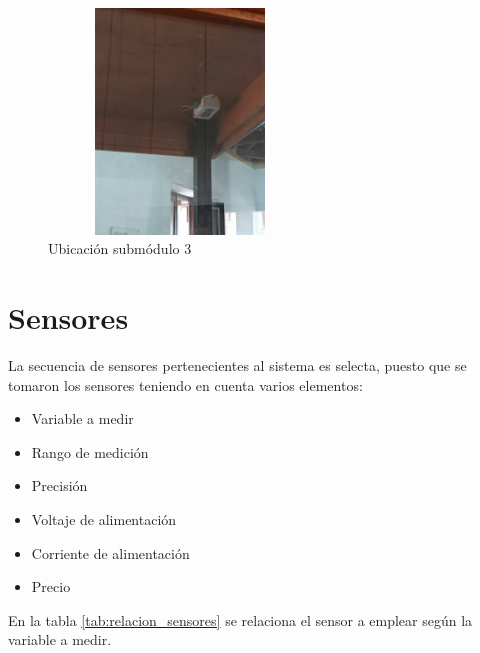     \begin{figure}[H]
        \centering
        \includegraphics[width=7cm, height=6cm]{imagenes/submodulo 3.jpg}
        \caption{Ubicación submódulo 3}
        \label{imag:ubicacion_submodulo3}
      \end{figure}

\section{Sensores} \label{sec:sensores}

    La secuencia de sensores pertenecientes al sistema es selecta, puesto que se tomaron los sensores teniendo en cuenta varios elementos:

    \begin{itemize}
        \item Variable a medir
        \item Rango de medición
        \item Precisión
        \item Voltaje de alimentación
        \item Corriente de alimentación
        \item Precio
    \end{itemize}

En la tabla \ref{tab:relacion_sensores} se relaciona el sensor a emplear según la variable a medir.

